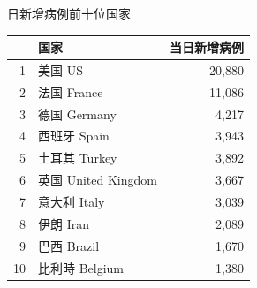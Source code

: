 \documentclass[
]{article}
\begin{document}
\begin{table}

    \begin{minipage}{.4\linewidth}
    \centering
    \captionsetup{justification=centering}
    \caption{日新增病例前十位国家}
    \vspace{-0.5\baselineskip}
      \centering
    \captionsetup{justification=centering} \begin{table}[H]
\centering\begingroup\fontsize{12}{14}\selectfont

\begin{tabular}{rlr}
\toprule
  & 国家 & 当日新增病例\\
\midrule
\rowcolor{gray!6}  1 & 美国 US & 20,880\\
2 & 法国 France & 11,086\\
\rowcolor{gray!6}  3 & 德国 Germany & 4,217\\
4 & 西班牙 Spain & 3,943\\
\rowcolor{gray!6}  5 & 土耳其 Turkey & 3,892\\
6 & 英国 United Kingdom & 3,667\\
\rowcolor{gray!6}  7 & 意大利 Italy & 3,039\\
8 & 伊朗 Iran & 2,089\\
\rowcolor{gray!6}  9 & 巴西 Brazil & 1,670\\
10 & 比利時 Belgium & 1,380\\
\bottomrule
\end{tabular}
\endgroup{}
\end{table} \end{minipage}
    \begin{minipage}{.6\linewidth}
    \centering
    \captionsetup{justification=centering}
     \caption{累计死亡病例前十位国家}
     \vspace{-0.5\baselineskip}
      \centering
    \captionsetup{justification=centering} \begin{table}[H]
\centering\begingroup\fontsize{12}{14}\selectfont


\end{table}
\end{minipage}
\end{table}
\end{document}
